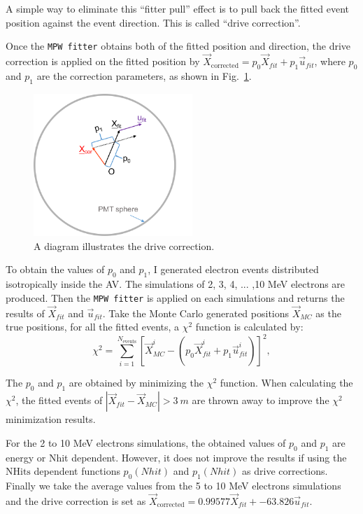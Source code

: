 A simple way to eliminate this ``fitter pull'' effect is to pull back the fitted event position against the event direction. This is called ``drive correction''.   

Once the \texttt{MPW fitter} obtains both of the fitted position and direction, the drive correction is applied on the fitted position by $\vec{X}_{\mathrm{corrected}} = p_0\vec{X}_{fit}+p_1\vec{u}_{fit}$, where $p_0$ and $p_1$ are the correction parameters, as shown in Fig.~\ref{drivecor}.
\begin{figure}[!htb]
	\centering
	\includegraphics[width=6cm]{driveCor.png}
	\caption{ A diagram illustrates the drive correction.}
	\label{drivecor}
\end{figure}

To obtain the values of $p_0$ and $p_1$, I generated electron events distributed isotropically inside the AV. The simulations of 2, 3, 4, ... ,10 MeV electrons are produced. Then the \texttt{MPW fitter} is applied on each simulations and returns the results of $\vec{X}_{fit}$ and $\vec{u}_{fit}$. Take the Monte Carlo generated positions $\vec{X}_{MC}$ as the true positions, for all the fitted events, a $\chi^2$ function is calculated by:
\begin{equation}
\chi^2 = \sum_{i=1}^{N_{\mathrm{events}}}[\vec{X}^i_{MC}-(p_0\vec{X}^i_{fit}+p_1\vec{u}^i_{fit})]^2,
\end{equation}

The $p_0$ and $p_1$ are obtained by minimizing the $\chi^2$ function. When calculating the $\chi^2$, the fitted events of $|\vec{X}_{fit}-\vec{X}_{MC}|>3~m$ are thrown away to improve the $\chi^2$ minimization results.

For the 2 to 10 MeV electrons simulations, the obtained values of $p_0$ and $p_1$ are energy or Nhit dependent. However, it does not improve the results if using the $\mathrm{NHits}$ dependent functions $p_0(Nhit)$ and $p_1(Nhit)$ as drive corrections.
Finally we take the average values from the 5 to 10 MeV electrons simulations and the drive correction is set as $\vec{X}_{\mathrm{corrected}} = 0.99577\vec{X}_{fit}+-63.826\vec{u}_{fit}$.

